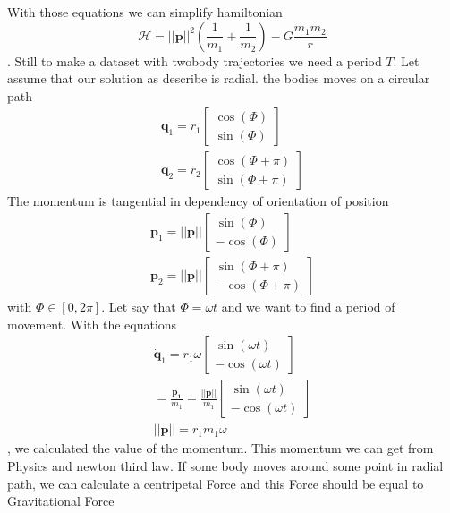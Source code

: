With those equations we can simplify hamiltonian \begin{equation}
	\mathcal{H}= ||\mathbf{p}||^2\left(\frac{1}{m_1}+\frac{1}{m_2}\right) - G\frac{m_1m_2}{r}
\end{equation}.
Still to make a dataset with twobody trajectories we need a period $T$. Let assume that our solution as describe is radial. the bodies moves on a circular path
\begin{eqnarray}
	\mathbf{q}_1 = r_1
	\begin{bmatrix}
		\cos(\Phi)\\
		\sin(\Phi)
	\end{bmatrix}\\
\mathbf{q}_2 = r_2
\begin{bmatrix}
	\cos(\Phi+ \pi)\\
	\sin(\Phi+ \pi)
\end{bmatrix}
\end{eqnarray}
The momentum is tangential in dependency of orientation of position
\begin{eqnarray}
	\mathbf{p}_1 = ||\mathbf{p}||
	\begin{bmatrix}
		\sin(\Phi)\\
		-\cos(\Phi)
	\end{bmatrix}\\
	\mathbf{p}_2 = ||\mathbf{p}||
	\begin{bmatrix}
		\sin(\Phi+ \pi)\\
		-\cos(\Phi+ \pi)
	\end{bmatrix}
\end{eqnarray} with $\Phi \in [0,2\pi] $.
Let say that $\Phi=\omega t$
and we want to find a period of movement.
With the equations
\begin{eqnarray}
	\dot{\mathbf{q}}_1 = r_1\omega
	\begin{bmatrix}
		\sin(\omega t)\\
		-\cos(\omega t)
	\end{bmatrix}\\ = \frac{\mathbf{p_1}}{m_1} = \frac{||\mathbf{p}||}{m_1}\begin{bmatrix}
	\sin(\omega t)\\
	-\cos(\omega t)
\end{bmatrix}\\
||\mathbf{p}|| = r_1m_1\omega
\end{eqnarray},
we calculated the value of the momentum.
This momentum we can get from Physics and newton third law. If some body moves around some point in radial path, we can calculate a centripetal Force and this Force should be equal to Gravitational Force

